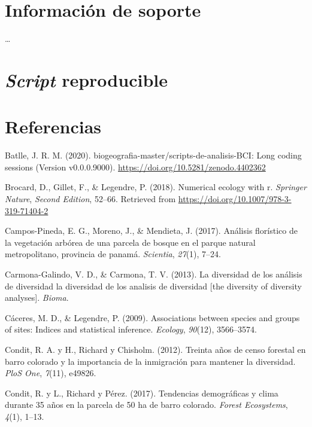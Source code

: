 \documentclass[11pt,]{article}
\begin{document}
\section{Información de soporte}\label{informaciuxf3n-de-soporte}

\ldots

\section{\texorpdfstring{\emph{Script}
reproducible}{Script reproducible}}\label{script-reproducible}

\section*{Referencias}\label{referencias}

\hypertarget{refs}{}
\hypertarget{ref-jose_ramon_martinez_batlle_2020_4402362}{}
Batlle, J. R. M. (2020). biogeografia-master/scripts-de-analisis-BCI:
Long coding sessions (Version v0.0.0.9000).
\url{https://doi.org/10.5281/zenodo.4402362}

\hypertarget{ref-brocard2011numerical}{}
Brocard, D., Gillet, F., \& Legendre, P. (2018). Numerical ecology with
r. \emph{Springer Nature}, \emph{Second Edition}, 52--66. Retrieved from
\url{https://doi.org/10.1007/978-3-319-71404-2}

\hypertarget{ref-campos2017analisis}{}
Campos-Pineda, E. G., Moreno, J., \& Mendieta, J. (2017). Análisis
florístico de la vegetación arbórea de una parcela de bosque en el
parque natural metropolitano, provincia de panamá. \emph{Scientia},
\emph{27}(1), 7--24.

\hypertarget{ref-carmona2013diversidad}{}
Carmona-Galindo, V. D., \& Carmona, T. V. (2013). La diversidad de los
análisis de diversidad la diversidad de los analisis de diversidad
{[}the diversity of diversity analyses{]}. \emph{Bioma}.

\hypertarget{ref-caceres2009associations}{}
Cáceres, M. D., \& Legendre, P. (2009). Associations between species and
groups of sites: Indices and statistical inference. \emph{Ecology},
\emph{90}(12), 3566--3574.

\hypertarget{ref-condit2012thirty}{}
Condit, R. A. y H., Richard y Chisholm. (2012). Treinta años de censo
forestal en barro colorado y la importancia de la inmigración para
mantener la diversidad. \emph{PloS One}, \emph{7}(11), e49826.

\hypertarget{ref-condit2017demographic}{}
Condit, R. y L., Richard y Pérez. (2017). Tendencias demográficas y
clima durante 35 años en la parcela de 50 ha de barro colorado.
\emph{Forest Ecosystems}, \emph{4}(1), 1--13.
\end{document}

